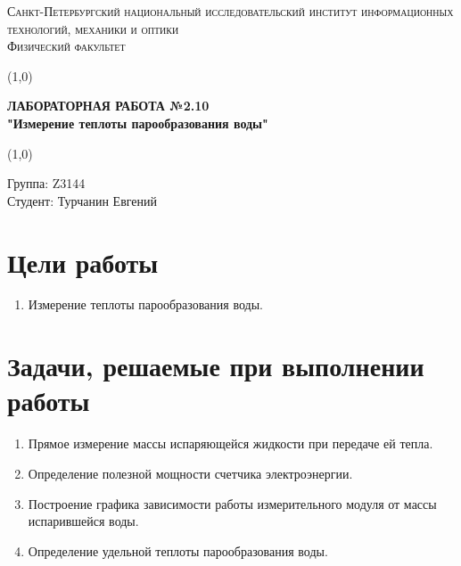 \documentclass[12pt, a4paper]{article}
\begin{document}
\begin{center}
\textsc{Санкт-Петербургский национальный исследовательский институт информационных технологий, механики и оптики\\[3mm]
Физический факультет} \\[3mm]
\end{center}
\vspace{5mm}
\line(1,0){\textwidth}
\begin{center}
\textbf{ЛАБОРАТОРНАЯ РАБОТА №2.10\\}
\textbf{"Измерение теплоты парообразования воды"}
\end{center}
\vspace{2mm}
\line(1,0){\textwidth}
\vspace{5mm}
\begin{minipage}{0.4\textwidth}
    Группа: Z3144 \\
    Студент: Турчанин Евгений\\
    \vspace{1mm}
\end{minipage}
\vspace{1cm}

\section{Цели работы}
\begin{enumerate}
    \item Измерение теплоты парообразования воды.
\end{enumerate}
\vspace{0.5cm}

\section{Задачи, решаемые при выполнении работы}
\begin{enumerate}
    \item Прямое измерение массы испаряющейся жидкости при передаче ей тепла.
    \item Определение полезной мощности счетчика электроэнергии.
    \item Построение графика зависимости работы измерительного модуля от массы испарившейся воды.
    \item Определение удельной теплоты парообразования воды.
\end{enumerate}
\vspace{0.5cm}
\end{document}
